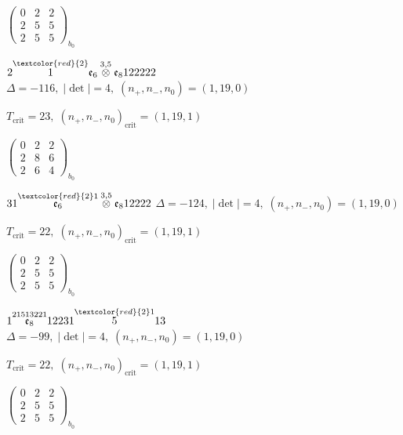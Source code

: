 \documentclass[10pt]{article}
\begin{document}
\hspace{2em}$\left(\begin{smallmatrix}0 & 2 & 2 \\ 2 & 5 & 5 \\ 2 & 5 & 5\end{smallmatrix}\right)_{\!b_0}$

\smallskip

$2\overset{\textcolor{red}{2}}{1}\mathfrak{e}_6\overset{3,5}{\otimes}\mathfrak{e}_8122222$ \quad $\Delta=-116,\; |\det|=4,\; (n_+,n_-,n_0)=(1,19,0)$

\hspace{1em}$T_{\text{crit}}=23,\; (n_+,n_-,n_0)_{\text{crit}}=(1,19,1)$

\hspace{2em}$\left(\begin{smallmatrix}0 & 2 & 2 \\ 2 & 8 & 6 \\ 2 & 6 & 4\end{smallmatrix}\right)_{\!b_0}$

\smallskip

$31\overset{\textcolor{red}{2}1}{\mathfrak{e}_6}\overset{3,5}{\otimes}\mathfrak{e}_812222$ \quad $\Delta=-124,\; |\det|=4,\; (n_+,n_-,n_0)=(1,19,0)$

\hspace{1em}$T_{\text{crit}}=22,\; (n_+,n_-,n_0)_{\text{crit}}=(1,19,1)$

\hspace{2em}$\left(\begin{smallmatrix}0 & 2 & 2 \\ 2 & 5 & 5 \\ 2 & 5 & 5\end{smallmatrix}\right)_{\!b_0}$

\smallskip

$1\overset{21513221}{\mathfrak{e}_8}12231\overset{\textcolor{red}{2}1}{5}13$ \quad $\Delta=-99,\; |\det|=4,\; (n_+,n_-,n_0)=(1,19,0)$

\hspace{1em}$T_{\text{crit}}=22,\; (n_+,n_-,n_0)_{\text{crit}}=(1,19,1)$

\hspace{2em}$\left(\begin{smallmatrix}0 & 2 & 2 \\ 2 & 5 & 5 \\ 2 & 5 & 5\end{smallmatrix}\right)_{\!b_0}$
\end{document}
